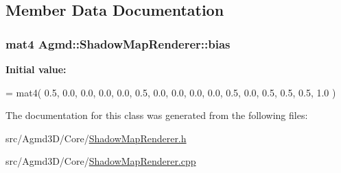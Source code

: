 \subsection{Member Data Documentation}
\hypertarget{class_agmd_1_1_shadow_map_renderer_afd8762e31e09edcb711068697e1f6911}{
\subsubsection[{bias}]{\setlength{\rightskip}{0pt plus 5cm}mat4 Agmd\+::\+Shadow\+Map\+Renderer\+::bias\hspace{0.3cm}{\ttfamily [static]}}}\label{class_agmd_1_1_shadow_map_renderer_afd8762e31e09edcb711068697e1f6911}
{\bfseries Initial value\+:}
\begin{DoxyCode}
= mat4(
                                        0.5, 0.0, 0.0, 0.0,
                                        0.0, 0.5, 0.0, 0.0,
                                        0.0, 0.0, 0.5, 0.0,
                                        0.5, 0.5, 0.5, 1.0
                                        )
\end{DoxyCode}


The documentation for this class was generated from the following files\+:\begin{DoxyCompactItemize}
\item 
src/\+Agmd3\+D/\+Core/\hyperlink{_shadow_map_renderer_8h}{Shadow\+Map\+Renderer.\+h}\item 
src/\+Agmd3\+D/\+Core/\hyperlink{_shadow_map_renderer_8cpp}{Shadow\+Map\+Renderer.\+cpp}\end{DoxyCompactItemize}

